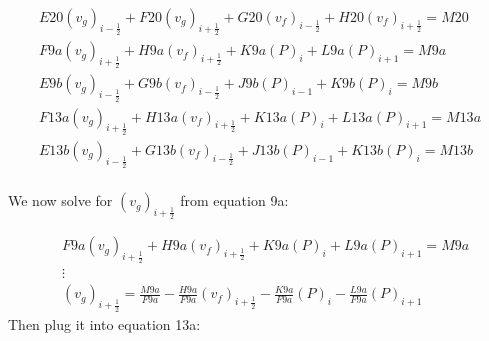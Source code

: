 \documentclass[11pt,letterpaper,titlepage]{article}
\newcommand{\half}{\frac{1}{2}}
\begin{document}
\begin{equation*}
\begin{aligned}
E20(v_g)_{i-\half} + F20(v_g)_{i+\half} + G20(v_f)_{i-\half} + H20(v_f)_{i+\half}  = M20 \\
                                                                                          F9a  (v_g)_{i+\half}                        + H9a  (v_f)_{i+\half}                                      + K9a  (P)_{i} + L9a  (P)_{i+1}=M9a \\ 
                                                                  E9b  (v_g)_{i-\half}                         + G9b  (v_f)_{i-\half}                                            + J9b  (P)_{i-1} + K9b  (P)_{i}                 =M9b \\ 
                                                                                          F13a (v_g)_{i+\half} +                        H13a (v_f)_{i+\half} +                                      K13a (P)_{i} + L13a (P)_{i+1}=M13a\\ 
                                                                  E13b (v_g)_{i-\half}  +                        G13b (v_f)_{i-\half}                                            + J13b (P)_{i-1} + K13b (P)_{i}                 =M13b\\ 
\end{aligned}
\end{equation*}
                  
                  
                  
                  
                  
                  

\newpage
\noindent
We now solve for $(v_g)_{i+\half}$ from equation 9a:

\begin{equation*}
\begin{aligned}
&F9a  (v_g)_{i+\half} + H9a  (v_f)_{i+\half} + K9a  (P)_{i} + L9a  (P)_{i+1}=M9a \\
&\vdots\\
&(v_g)_{i+\half}=\frac{M9a}{F9a} - \frac{H9a}{F9a}  (v_f)_{i+\half} - \frac{K9a}{F9a}  (P)_{i} - \frac{L9a}{F9a}  (P)_{i+1}
\end{aligned}
\end{equation*}
\newline
\noindent
Then plug it into equation 13a:
\end{document}
